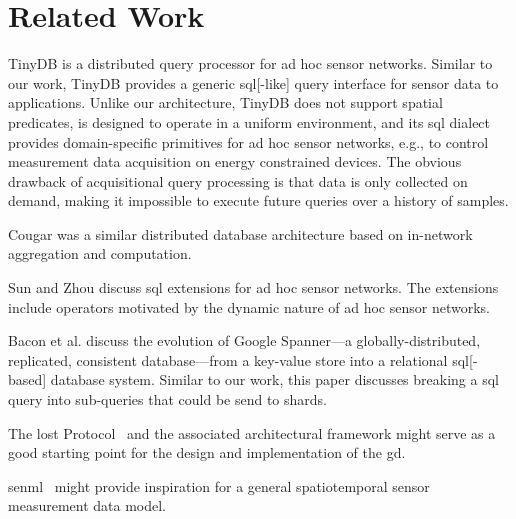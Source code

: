 \documentclass[conference,10pt]{IEEEtran}
\begin{document}
%
%
%

\section{Related Work}\label{sec:related-work}


TinyDB \cite{madden2005tinydb} is a distributed query processor for ad hoc sensor networks. Similar to our work, TinyDB provides a generic \gls{sql}[-like] query interface for sensor data to applications. Unlike our architecture, TinyDB does not support spatial predicates, is designed to operate in a uniform environment, and its \gls{sql} dialect provides domain-specific primitives for ad hoc sensor networks, e.g., to control measurement data acquisition on energy constrained devices. The obvious drawback of acquisitional query processing is that data is only collected on demand, making it impossible to execute future queries over a history of samples.

Cougar \cite{yao2002cougar} was a similar distributed database architecture based on in-network aggregation and computation.

Sun and Zhou \cite{sun2010querying} discuss \gls{sql} extensions for ad hoc sensor networks. The extensions include operators motivated by the dynamic nature of ad hoc sensor networks.

Bacon et al. \cite{bacon2017spanner} discuss the evolution of Google Spanner---a globally-distributed, replicated, consistent database---from a key-value store into a relational \gls{sql}[-based] database system. Similar to our work, this paper discusses breaking a \gls{sql} query into sub-queries that could be send to shards.

The \gls{lost} Protocol~\cite{rfc5222} and the associated architectural framework \cite{rfc5012,rfc5582} might serve as a good starting point for the design and implementation of the \gls{gd}.

\gls{senml}~\cite{rfc8428} might provide inspiration for a general spatiotemporal sensor measurement data model.
\end{document}
